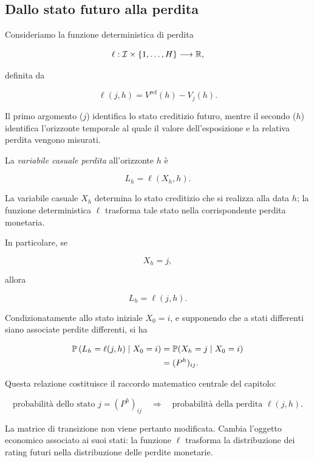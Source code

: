 \subsection{Dallo stato futuro alla perdita}

\label{subsec:cap9-stato-perdita}

Consideriamo la funzione deterministica di perdita

\[
\ell:
\mathcal{I}\times\{1,\ldots,H\}
\longrightarrow
\mathbb{R},
\]

definita da

\[
\ell(j,h)
=
V^{\mathrm{ref}}(h)-V_j(h).
\]

Il primo argomento ($j$) identifica lo stato creditizio futuro, mentre il
secondo ($h$) identifica l'orizzonte temporale al quale il valore
dell'esposizione e la relativa perdita vengono misurati.

\begin{definition}
La \emph{variabile casuale perdita} all'orizzonte $h$ \`{e}

\[
L_h
=
\ell(X_h,h).
\]
\end{definition}

La variabile casuale $X_h$ determina lo stato creditizio che si
realizza alla data $h$; la funzione deterministica $\ell$ trasforma
tale stato nella corrispondente perdita monetaria.

In particolare, se

\[
X_h=j,
\]

allora

\[
L_h=\ell(j,h).
\]

Condizionatamente allo stato iniziale $X_0=i$, e supponendo che a
stati differenti siano associate perdite differenti, si ha

\[
\begin{split}
\mathbb{P}
\left(
L_h=\ell(j,h)
\mid X_0=i
\right)
&=
\mathbb{P}(X_h=j\mid X_0=i)
\\
&=
(P^h)_{ij}.
\end{split}
\]

Questa relazione costituisce il raccordo matematico centrale del
capitolo:

\[
\boxed{
\text{probabilit\`{a} dello stato $j$}
=
(P^h)_{ij}
\quad\Longrightarrow\quad
\text{probabilit\`{a} della perdita $\ell(j,h)$}.
}
\]

La matrice di transizione non viene pertanto modificata. Cambia
l'oggetto economico associato ai suoi stati: la funzione $\ell$
trasforma la distribuzione dei rating futuri nella distribuzione delle
perdite monetarie.


